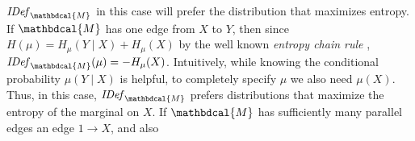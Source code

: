 \documentclass{article}
\theoremstyle{plain}
\theoremstyle{definition}
\theoremstyle{remark}
\let\H\relax
\DeclareMathOperator{\H}{\mathrm{H}} %
\newcommand{\dg}[1]{\mathbdcal{#1}}
\newcommand{\IDef}[1]{\mathit{IDef}_{#1}}
\numberwithin{equation}{section}
\begin{document}
$\IDef{\dg M}$ in this case will prefer the distribution that
maximizes entropy.
If $\dg M$ has one edge from $X$ to $Y$, then since
$H(\mu) = H_{\mu}(Y \mid X) + H_\mu(X)$ by the well known 
\emph{entropy chain rule} \cite{mackay2003information},
$\IDef{\dg   M}(\mu) = -H_{\mu}(X)$.
Intuitively, while knowing the conditional probability $\mu(Y \mid X)$
is helpful, to completely specify $\mu$ we also need 
$\mu(X)$.     Thus, in this case, $\IDef{\dg
  M}$ prefers distributions that maximize the entropy of 
the marginal on $X$.
If $\dg M$ has  
 sufficiently many parallel edges
an edge $1 \to X$, and also 
\end{document}
